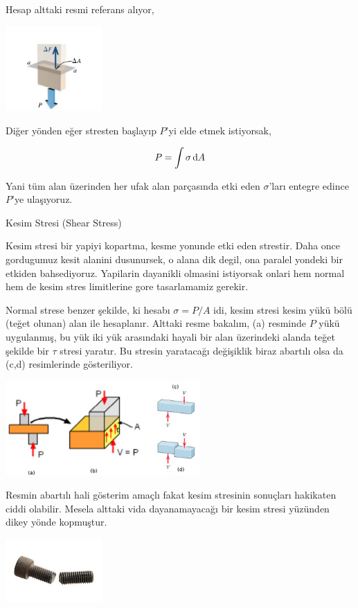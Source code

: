 \documentclass[12pt,fleqn]{article}\usepackage{../../common}
\begin{document}
Hesap alttaki resmi referans alıyor,

\includegraphics[width=10em]{phy_020_strs_01_02.jpg}

Diğer yönden eğer stresten başlayıp $P$'yi elde etmek istiyorsak,

$$
P = \int \sigma \,\mathrm{d} A
$$

Yani tüm alan üzerinden her ufak alan parçasında etki eden $\sigma$'ları
entegre edince $P$'ye ulaşıyoruz.

Kesim Stresi (Shear Stress)

Kesim stresi bir yapiyi kopartma, kesme yonunde etki eden strestir. Daha
once gordugumuz kesit alanini dusunursek, o alana dik degil, ona paralel
yondeki bir etkiden bahsediyoruz. Yapilarin dayanikli olmasini istiyorsak
onlari hem normal hem de kesim stres limitlerine gore tasarlamamiz gerekir.

Normal strese benzer şekilde, ki hesabı $\sigma = P/A$ idi, kesim stresi kesim
yükü bölü (teğet olunan) alan ile hesaplanır. Alttaki resme bakalım, (a)
resminde $P$ yükü uygulanmış, bu yük iki yük arasındaki hayali bir alan
üzerindeki alanda teğet şekilde bir $\tau$ stresi yaratır. Bu stresin yaratacağı
değişiklik biraz abartılı olsa da (c,d) resimlerinde gösteriliyor.

\includegraphics[width=20em]{phy_020_strs_01_03.jpg}

Resmin abartılı hali gösterim amaçlı fakat kesim stresinin sonuçları hakikaten
ciddi olabilir. Mesela alttaki vida dayanamayacağı bir kesim stresi yüzünden
dikey yönde kopmuştur.

\includegraphics[width=10em]{phy_020_strs_01_04.jpg}
\end{document}
